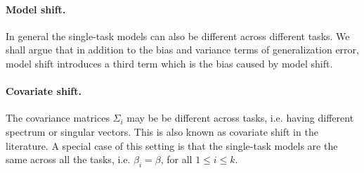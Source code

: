 \paragraph{Model shift.}
In general the single-task models can also be different across different tasks.
We shall argue that in addition to the bias and variance terms of generalization error, model shift introduces a third term which is the bias caused by model shift.



\paragraph{Covariate shift.}
The covariance matrices $\Sigma_i$ may be be different across tasks, i.e. having different spectrum or singular vectors.
This is also known as covariate shift in the literature.
A special case of this setting is that the single-task models are the same across all the tasks, i.e. $\beta_i = \beta$, for all $1\le i\le k$.

